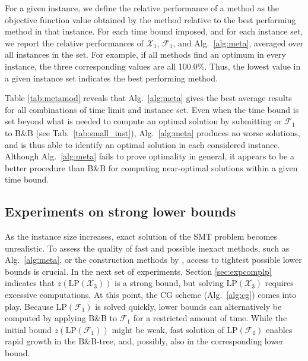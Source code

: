 For a given instance, we define the relative performance of a method as the objective function value obtained by the method relative to the best performing method in that instance.
For each time bound imposed, and for each instance set,
we report the relative performances of $\mathcal{X}_1$, $\mathcal{F}_1$, and Alg.\ \ref{alg:meta}, averaged over all instances in the set.
For example, if all methods find an optimum in every instance, the three corresponding values are all 100.0\%.
Thus, the lowest value in a given instance set indicates the best performing method.

Table \ref{tab:metamod} reveals that Alg.\ \ref{alg:meta} gives the best average results for all combinations of time limit and instance set.
Even when the time bound is set beyond what is needed to compute an optimal solution by submitting or $\mathcal{F}_1$ to B\&B (see Tab.\ \ref{tab:small_inst}),
Alg.~\ref{alg:meta} produces no worse solutions, and is thus able to identify an optimal solution in each considered instance.
Although Alg.\ \ref{alg:meta} fails to prove optimality in general, it appears to be a better procedure than B\&B for computing near-optimal solutions within a given time bound.
\newline

\subsection{Experiments on strong lower bounds}

As the instance size increases, exact solution of the SMT problem becomes unrealistic.
To assess the quality of fast and possible inexact methods, such as Alg.\ \ref{alg:meta}, 
or the construction methods by \cite{ivanova16isco},  access to tightest possible lower bounds is crucial.
In the next set of experiments, 
Section \ref{sec:expcomplp} indicates that $z\left(\text{LP}(\mathcal{X}_3)\right)$ is a strong bound,
but solving $\text{LP}(\mathcal{X}_3)$ requires excessive computations.
At this point, the CG scheme (Alg.\ \ref{alg:cg}) comes into play.
Because $\text{LP}(\mathcal{F}_1)$ is solved quickly, lower bounds can alternatively be computed 
by applying B\&B to $\mathcal{F}_1$ for a restricted amount of time.
While the initial bound $z\left(\text{LP}(\mathcal{F}_1)\right)$ might be weak, fast solution of $\text{LP}(\mathcal{F}_1)$ enables rapid growth in the B\&B-tree,
and, possibly, also in the corresponding lower bound.

